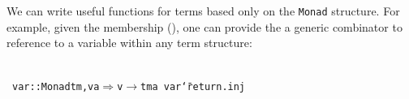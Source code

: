 \documentclass[9pt,preprint,authoryear]{sigplanconf}
\begin{document}
%
We can write useful functions for terms based only on the \textcolor[rgb]{0,0,0.80}{\texttt{Monad}} structure. 
    For example, given the membership (\textcolor[rgb]{0,0,0.80}{\texttt{\makebox[1.22ex][c]{$ \in $}}}), one can provide the a
    generic combinator to reference to a variable within any term structure{:}%


{\nopagebreak }

%
%
%
~\\~\vphantom{$\{$}\textcolor[rgb]{0,0,0.80}{\texttt{var}}\textcolor[rgb]{0,0,0.80}{\texttt{\mbox{\hspace{0.50em}}}}\textcolor[cmyk]{0,0.65,0.99,0}{\texttt{{:}{:}}}\textcolor[rgb]{0,0,0.80}{\texttt{\mbox{\hspace{0.50em}}}}\textcolor[cmyk]{0,0.65,0.99,0}{\texttt{\makebox[1.22ex][l]{$ {(} $}}}\textcolor[rgb]{0,0,0.80}{\texttt{Monad}}\textcolor[rgb]{0,0,0.80}{\texttt{\mbox{\hspace{0.50em}}}}\textcolor[rgb]{0,0,0.80}{\texttt{tm,}}\textcolor[rgb]{0,0,0.80}{\texttt{\mbox{\hspace{0.50em}}}}\textcolor[rgb]{0,0,0.80}{\texttt{v}}\textcolor[rgb]{0,0,0.80}{\texttt{\mbox{\hspace{0.50em}}}}\textcolor[rgb]{0,0,0.80}{\texttt{\makebox[1.22ex][c]{$ \in $}}}\textcolor[rgb]{0,0,0.80}{\texttt{\mbox{\hspace{0.50em}}}}\textcolor[rgb]{0,0,0.80}{\texttt{a}}\textcolor[cmyk]{0,0.65,0.99,0}{\texttt{\makebox[1.22ex][r]{$ {)} $}}}\textcolor[rgb]{0,0,0.80}{\texttt{\mbox{\hspace{0.50em}}}}\textcolor[cmyk]{0,0.65,0.99,0}{\texttt{$ \Rightarrow $}}\textcolor[rgb]{0,0,0.80}{\texttt{\mbox{\hspace{0.50em}}}}\textcolor[rgb]{0,0,0.80}{\texttt{v}}\textcolor[rgb]{0,0,0.80}{\texttt{\mbox{\hspace{0.50em}}}}\textcolor[cmyk]{0,0.65,0.99,0}{\texttt{$ \rightarrow $}}\textcolor[rgb]{0,0,0.80}{\texttt{\mbox{\hspace{0.50em}}}}\textcolor[rgb]{0,0,0.80}{\texttt{tm}}\textcolor[rgb]{0,0,0.80}{\texttt{\mbox{\hspace{0.50em}}}}\textcolor[rgb]{0,0,0.80}{\texttt{a}}\textcolor[rgb]{0,0,0.80}{\texttt{{\nopagebreak \newline%
}\vphantom{$\{$}}}\textcolor[rgb]{0,0,0.80}{\texttt{var}}\textcolor[rgb]{0,0,0.80}{\texttt{\mbox{\hspace{0.50em}}}}\textcolor[cmyk]{0,0.65,0.99,0}{\texttt{{\char `\=}}}\textcolor[rgb]{0,0,0.80}{\texttt{\mbox{\hspace{0.50em}}}}\textcolor[rgb]{0,0,0.80}{\texttt{return}}\textcolor[rgb]{0,0,0.80}{\texttt{\mbox{\hspace{0.50em}}}}\textcolor[cmyk]{0,0.65,0.99,0}{\texttt{.}}\textcolor[rgb]{0,0,0.80}{\texttt{\mbox{\hspace{0.50em}}}}\textcolor[rgb]{0,0,0.80}{\texttt{inj}}\textcolor[rgb]{0,0,0.80}{\texttt{{\nopagebreak \newline%
}\vphantom{$\{$}}}%
\end{document}
